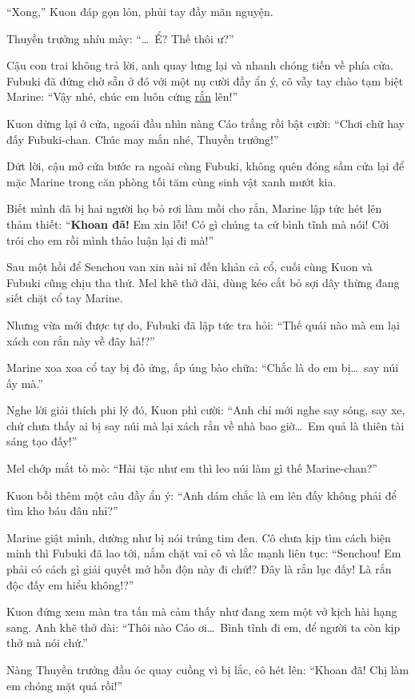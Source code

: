 \documentclass[../main.tex]{subfiles}
\begin{document}
``Xong,'' Kuon đáp gọn lỏn, phủi tay đầy mãn nguyện.

Thuyền trưởng nhíu mày: ``\dots\ Ể? Thế thôi ư?''

Cậu con trai không trả lời, anh quay lưng lại và nhanh chóng tiến về phía cửa. Fubuki đã đứng chờ sẵn ở đó với một nụ cười đầy ẩn ý, cô vẫy tay chào tạm biệt Marine: ``Vậy nhé, chúc em luôn cứng \uline{rắn} lên!''

Kuon dừng lại ở cửa, ngoái đầu nhìn nàng Cáo trắng rồi bật cười: ``Chơi chữ hay đấy Fubuki-chan. Chúc may mắn nhé, Thuyền trưởng!''

Dứt lời, cậu mở cửa bước ra ngoài cùng Fubuki, không quên đóng sầm cửa lại để mặc Marine trong căn phòng tối tăm cùng sinh vật xanh mướt kia.

Biết mình đã bị hai người họ bỏ rơi làm mồi cho rắn, Marine lập tức hét lên thảm thiết: ``\textbf{Khoan đã!} Em xin lỗi! Có gì chúng ta cứ bình tĩnh mà nói! Cởi trói cho em rồi mình thảo luận lại đi mà!''


Sau một hồi để Senchou van xin nài nỉ đến khản cả cổ, cuối cùng Kuon và Fubuki cũng chịu tha thứ. Mel khẽ thở dài, dùng kéo cắt bỏ sợi dây thừng đang siết chặt cổ tay Marine.

Nhưng vừa mới được tự do, Fubuki đã lập tức tra hỏi: ``Thế quái nào mà em lại xách con rắn này về đây hả!?''

Marine xoa xoa cổ tay bị đỏ ửng, ấp úng bào chữa: ``Chắc là do em bị\dots\ say núi ấy mà.''

Nghe lời giải thích phi lý đó, Kuon phì cười: ``Anh chỉ mới nghe say sóng, say xe, chứ chưa thấy ai bị say núi mà lại xách rắn về nhà bao giờ\dots\ Em quả là thiên tài sáng tạo đấy!''

Mel chớp mắt tò mò: ``Hải tặc như em thì leo núi làm gì thế Marine-chan?''

Kuon bồi thêm một câu đầy ẩn ý: ``Anh dám chắc là em lên đấy không phải để tìm kho báu đâu nhỉ?''

Marine giật mình, dường như bị nói trúng tim đen. Cô chưa kịp tìm cách biện minh thì Fubuki đã lao tới, nắm chặt vai cô và lắc mạnh liên tục: ``Senchou! Em phải có cách gì giải quyết mớ hỗn độn này đi chứ!? Đây là rắn lục đấy! Là rắn độc đấy em hiểu không!?''

Kuon đứng xem màn tra tấn mà cảm thấy như đang xem một vở kịch hài hạng sang. Anh khẽ thở dài: ``Thôi nào Cáo ơi\dots\ Bình tĩnh đi em, để người ta còn kịp thở mà nói chứ.''

Nàng Thuyền trưởng đầu óc quay cuồng vì bị lắc, cô hét lên: ``Khoan đã! Chị làm em chóng mặt quá rồi!''
\end{document}
